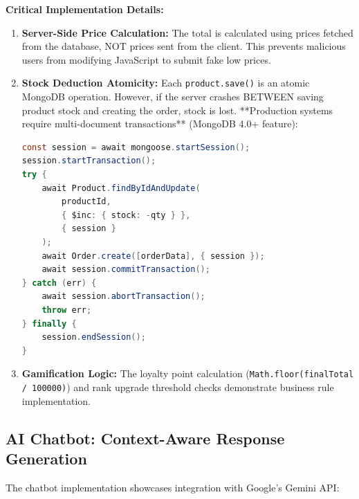 \documentclass[12pt, a4paper]{report}
\begin{document}
\textbf{Critical Implementation Details:}

\begin{enumerate}
    \item \textbf{Server-Side Price Calculation:} The total is calculated using prices fetched from the database, NOT prices sent from the client. This prevents malicious users from modifying JavaScript to submit fake low prices.
    
    \item \textbf{Stock Deduction Atomicity:} Each \texttt{product.save()} is an atomic MongoDB operation. However, if the server crashes BETWEEN saving product stock and creating the order, stock is lost. **Production systems require multi-document transactions** (MongoDB 4.0+ feature):
    
    \begin{lstlisting}[language=Java, caption=Transaction-Based Implementation (Future Enhancement)]
const session = await mongoose.startSession();
session.startTransaction();
try {
    await Product.findByIdAndUpdate(
        productId, 
        { $inc: { stock: -qty } },
        { session }
    );
    await Order.create([orderData], { session });
    await session.commitTransaction();
} catch (err) {
    await session.abortTransaction();
    throw err;
} finally {
    session.endSession();
}
    \end{lstlisting}
    
    \item \textbf{Gamification Logic:} The loyalty point calculation (\texttt{Math.floor(finalTotal / 100000)}) and rank upgrade threshold checks demonstrate business rule implementation.
\end{enumerate}

\subsection{AI Chatbot: Context-Aware Response Generation}

The chatbot implementation showcases integration with Google's Gemini API:
\end{document}
